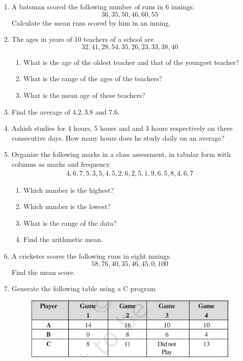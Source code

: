 \begin{enumerate}[label=\thesection.\arabic*, ref=\thesection.\theenumi]
\item A batsman scored the following number of runs in 6 innings.  
	$$36, 35, 50, 46, 60, 55$$
	Calculate the mean runs scored by him in an inning.
	\\
	\solution
	
\item The ages in years of 10 teachers of a school are
	$$32, 41, 28, 54, 35, 26, 23, 33, 38, 40$$
	\begin{enumerate}
		\item What is the age of the oldest teacher and that of the youngest teacher?
			\\
			\solution
	
		\item What is the range of the ages of the teachers?
		\item What is the mean age of these teachers?
	\end{enumerate}
\item Find the average of $4.2, 3.8$ and $7.6$.
\item Ashish studies for 4 hours, 5 hours and and 3 hours respectively on three consecutive days.  How many hours does he study daily on an average?
\item Organize the following marks in a class assessment, in tabular form with columns as marks and frequency.
	\begin{gather}
	4, 6, 7, 5, 3, 5, 4, 5, 2, 6, 2, 5, 1, 9, 6, 5, 8, 4, 6, 7
	\end{gather}
	\begin{enumerate}
		\item Which number is the highest?
		\item Which number is the lowest?
		\item What is the range of the data?
		\item Find the arithmetic mean.
	\end{enumerate}
	
	\solution
\item A cricketer scores the following runs in eight innings.
	$$58, 76, 40, 35, 46, 45, 0, 100$$
	Find the mean score.
\item Generate the following table using a C program
	\begin{figure}[H]
  \centering
  \includegraphics[width=\columnwidth]{figs/data.jpg}

\end{figure}
\end{enumerate}
